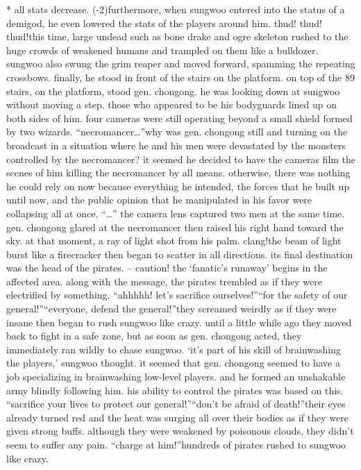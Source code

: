 * all stats decrease.
 (-2)furthermore, when sungwoo entered into the status of a demigod, he even lowered the stats of the players around him.
thud! thud! thud!this time, large undead such as bone drake and ogre skeleton rushed to the huge crowds of weakened humans and trampled on them like a bulldozer.
sungwoo also swung the grim reaper and moved forward, spamming the repeating crossbows.
 finally, he stood in front of the stairs on the platform.
on top of the 89 stairs, on the platform, stood gen.
 chongong.
 he was looking down at sungwoo without moving a step.
those who appeared to be his bodyguards lined up on both sides of him.
four cameras were still operating beyond a small shield formed by two wizards.
“necromancer…”why was gen.
 chongong still and turning on the broadcast in a situation where he and his men were devastated by the monsters controlled by the necromancer? it seemed he decided to have the cameras film the scenes of him killing the necromancer by all means.
otherwise, there was nothing he could rely on now because everything he intended, the forces that he built up until now, and the public opinion that he manipulated in his favor were collapsing all at once.
“…”
the camera lens captured two men at the same time.
gen.
 chongong glared at the necromancer then raised his right hand toward the sky.
at that moment, a ray of light shot from his palm.
clang!the beam of light burst like a firecracker then began to scatter in all directions.
its final destination was the head of the pirates.
– caution! the ‘fanatic’s runaway’ begins in the affected area.
along with the message, the pirates trembled as if they were electrified by something.
“ahhhhh! let’s sacrifice ourselves!”“for the safety of our general!”“everyone, defend the general!”they screamed weirdly as if they were insane then began to rush sungwoo like crazy.
until a little while ago they moved back to fight in a safe zone, but as soon as gen.
 chongong acted, they immediately ran wildly to chase sungwoo.
‘it’s part of his skill of brainwashing the players,’ sungwoo thought.
it seemed that gen.
 chongong seemed to have a job specializing in brainwashing low-level players.
 and he formed an unshakable army blindly following him.
 his ability to control the pirates was based on this.
“sacrifice your lives to protect our general!”“don’t be afraid of death!”their eyes already turned red and the heat was surging all over their bodies as if they were given strong buffs.
 although they were weakened by poisonous clouds, they didn’t seem to suffer any pain.
“charge at him!”hundreds of pirates rushed to sungwoo like crazy.
